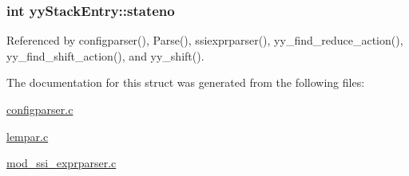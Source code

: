 \hypertarget{structyyStackEntry_afc9067f0daf86863e10c7c4000cba1ad}{
\subsubsection[{stateno}]{\setlength{\rightskip}{0pt plus 5cm}int yy\-Stack\-Entry\-::stateno}}\label{structyyStackEntry_afc9067f0daf86863e10c7c4000cba1ad}


Referenced by configparser(), Parse(), ssiexprparser(), yy\-\_\-find\-\_\-reduce\-\_\-action(), yy\-\_\-find\-\_\-shift\-\_\-action(), and yy\-\_\-shift().



The documentation for this struct was generated from the following files\-:\begin{DoxyCompactItemize}
\item 
\hyperlink{configparser_8c}{configparser.\-c}\item 
\hyperlink{lempar_8c}{lempar.\-c}\item 
\hyperlink{mod__ssi__exprparser_8c}{mod\-\_\-ssi\-\_\-exprparser.\-c}\end{DoxyCompactItemize}
